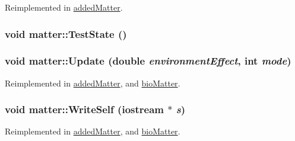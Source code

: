Reimplemented in \hyperlink{classadded_matter_a3627f9e81c355df213e783f1ba4a53b2}{addedMatter}.\hypertarget{classmatter_a163ce999b80e53c044fb9d948da510e3}{
\subsubsection[{TestState}]{\setlength{\rightskip}{0pt plus 5cm}void matter::TestState ()}}
\label{classmatter_a163ce999b80e53c044fb9d948da510e3}
\hypertarget{classmatter_a2b3dd492a18a139790bd227e2b4e0a70}{
\subsubsection[{Update}]{\setlength{\rightskip}{0pt plus 5cm}void matter::Update (double {\em environmentEffect}, \/  int {\em mode})}}
\label{classmatter_a2b3dd492a18a139790bd227e2b4e0a70}


Reimplemented in \hyperlink{classadded_matter_af259408e737a8605b710842d67f72ad7}{addedMatter}, and \hyperlink{classbio_matter_a8ed040ad0f1ef141ae9e5507f33c924a}{bioMatter}.\hypertarget{classmatter_a69825448805e58acc5418362a11eac2b}{
\subsubsection[{WriteSelf}]{\setlength{\rightskip}{0pt plus 5cm}void matter::WriteSelf (iostream $\ast$ {\em s})}}
\label{classmatter_a69825448805e58acc5418362a11eac2b}


Reimplemented in \hyperlink{classadded_matter_a288683b6f62f782a4cd1706d48dc1c0e}{addedMatter}, and \hyperlink{classbio_matter_aa8e3723aef3ce483763e621543d4104c}{bioMatter}.

